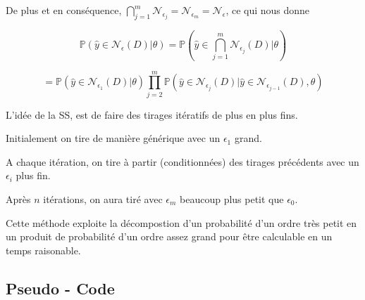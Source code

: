 \documentclass[french,12pt]{article}
\begin{document}
De plus et en conséquence, $\bigcap_{j = 1}^m \mathcal{N}_{\epsilon_j} = \mathcal{N}_{\epsilon_m} = \mathcal{N}_{\epsilon} $, ce qui nous donne

$$ \mathbb{P} \left(\hat{y} \in \mathcal{N}_{\epsilon} (D)| \theta \right) = \mathbb{P} \left(\hat{y} \in \bigcap_{j = 1}^m \mathcal{N}_{\epsilon_j} (D)| \theta\right)$$

$$= \mathbb{P} \left(\hat{y} \in \mathcal{N}_{\epsilon_1} (D)| \theta\right)
    \prod_{j = 2}^{m} \mathbb{P} \left(\hat{y} \in \mathcal{N}_{\epsilon_j} (D)|\hat{y} \in \mathcal{N}_{\epsilon_{j - 1}} (D), \theta\right)$$


L'idée de la SS, est de faire des tirages itératifs de plus en plus fins.

Initialement on tire de manière générique avec un $\epsilon_1$ grand.

A chaque itération, on tire à partir (conditionnées) des tirages précédents avec un $\epsilon_i$ plus fin.

Après $n$ itérations, on aura tiré avec $\epsilon_m$ beaucoup plus petit que $\epsilon_0$.

Cette méthode exploite la décompostion d'un probabilité d'un ordre très petit
en un produit de probabilité d'un ordre assez grand pour être calculable en un temps raisonable.



\subsection{Pseudo - Code}

\end{document}

